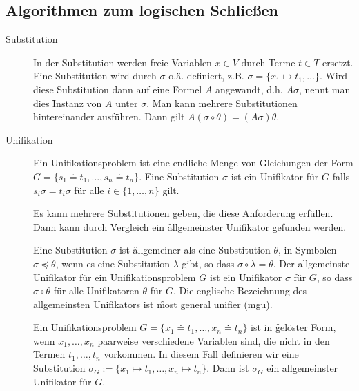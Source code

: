 \subsection{Algorithmen zum logischen Schließen}
    \begin{description}
        \item[Substitution] In der Substitution werden freie Variablen $x \in V$ durch Terme $t \in T$ ersetzt.
            Eine Substitution wird durch $\sigma$ o.ä. definiert, z.B. $\sigma = \{x_{1} \mapsto t_{1}, \dots \}$. Wird diese Substitution dann auf eine Formel $A$ angewandt, d.h. $A\sigma$, nennt man dies \f{Instanz} von $A$ unter $\sigma$. Man kann mehrere Substitutionen hintereinander ausführen. Dann gilt $A(\sigma\circ\theta) = (A\sigma)\theta$.{}

        \item[Unifikation] Ein Unifikationsproblem ist eine endliche Menge von Gleichungen der Form \\ $G = \{s_{1} \doteq t_{1}, \dots , s_{n} \doteq t_{n} \}$.
            Eine Substitution $\sigma$ ist ein Unifikator für $G$ falls $s_{i}\sigma = t_{i}\sigma$ für alle $i \in \{ 1, \dots , n \}$ gilt. 

            Es kann mehrere Substitutionen geben, die diese Anforderung erfüllen. Dann kann durch Vergleich ein \f{allgemeinster Unifikator} gefunden werden.

            Eine Substitution $\sigma$ ist \f{allgemeiner} als eine Substitution $\theta$, in Symbolen $\sigma \preceq \theta$, wenn es eine Substitution $\lambda$ gibt, so dass $\sigma \circ \lambda = \theta$. Der allgemeinste Unifikator für ein Unifikationsproblem $G$ ist ein Unifikator $\sigma$ für $G$, so dass $\sigma \circ \theta$ für alle Unifikatoren $\theta$ für $G$. Die englische Bezeichnung des allgemeinsten Unifikators ist \f{most general unifier (mgu)}.

            Ein Unifikationsproblem $G = \{x_{1} \doteq t_{1}, \dots , x_{n} \doteq t_{n} \}$ ist in \f{gelöster Form}, wenn $x_{1}, \dots, x_{n}$ paarweise verschiedene Variablen sind, die nicht in den Termen $t_{1}, \dots, t_{n}$ vorkommen. In diesem Fall definieren wir eine Substitution $\sigma_{G} := \{ x_{1} \mapsto t_{1}, \dots , x_{n}\mapsto t_{n} \}$. Dann ist $\sigma_{G}$ ein allgemeinster Unifikator für $G$.


\end{description}
